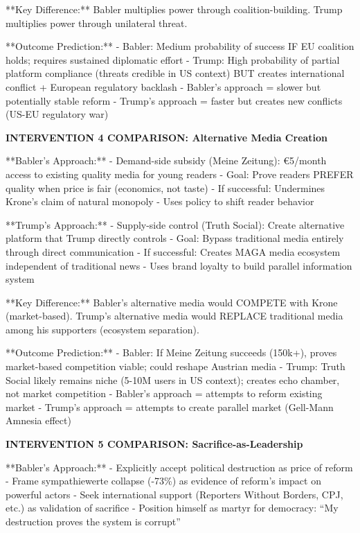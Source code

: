 **Key Difference:** Babler multiplies power through coalition-building. Trump multiplies power through unilateral threat.

**Outcome Prediction:**
- Babler: Medium probability of success IF EU coalition holds; requires sustained diplomatic effort
- Trump: High probability of partial platform compliance (threats credible in US context) BUT creates
  international conflict + European regulatory backlash
- Babler's approach = slower but potentially stable reform
- Trump's approach = faster but creates new conflicts (US-EU regulatory war)

\vspace{0.5cm}

\textbf{INTERVENTION 4 COMPARISON: Alternative Media Creation}

**Babler's Approach:**
- Demand-side subsidy (Meine Zeitung): €5/month access to existing quality media for young readers
- Goal: Prove readers PREFER quality when price is fair (economics, not taste)
- If successful: Undermines Krone's claim of natural monopoly
- Uses policy to shift reader behavior

**Trump's Approach:**
- Supply-side control (Truth Social): Create alternative platform that Trump directly controls
- Goal: Bypass traditional media entirely through direct communication
- If successful: Creates MAGA media ecosystem independent of traditional news
- Uses brand loyalty to build parallel information system

**Key Difference:** Babler's alternative media would COMPETE with Krone (market-based). Trump's alternative media would
REPLACE traditional media among his supporters (ecosystem separation).

**Outcome Prediction:**
- Babler: If Meine Zeitung succeeds (150k+), proves market-based competition viable; could reshape Austrian media
- Trump: Truth Social likely remains niche (5-10M users in US context); creates echo chamber, not market competition
- Babler's approach = attempts to reform existing market
- Trump's approach = attempts to create parallel market (Gell-Mann Amnesia effect)

\vspace{0.5cm}

\textbf{INTERVENTION 5 COMPARISON: Sacrifice-as-Leadership}

**Babler's Approach:**
- Explicitly accept political destruction as price of reform
- Frame sympathiewerte collapse (-73\%) as evidence of reform's impact on powerful actors
- Seek international support (Reporters Without Borders, CPJ, etc.) as validation of sacrifice
- Position himself as martyr for democracy: ``My destruction proves the system is corrupt''

